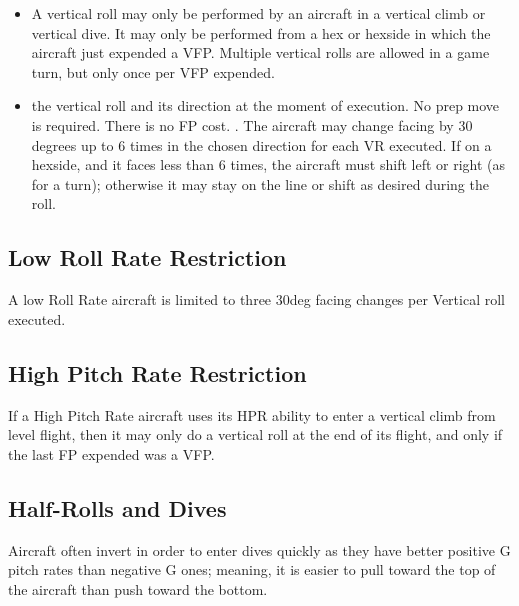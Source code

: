 \begin{itemize}

    \item{} A vertical roll may only be performed by an aircraft in a vertical climb or vertical dive. It may only be performed from a hex or hexside in which the aircraft just expended a VFP. Multiple vertical rolls are allowed in a game turn, but only once per VFP expended.

    \item{}  the vertical roll and its direction at the moment of execution. No prep move is required. There is no FP cost. . The aircraft may change facing  by 30 degrees up to 6 times in the chosen direction for each VR executed. If on a hexside, and it faces less than 6 times, the aircraft must shift left or right (as for a turn); otherwise it may stay on the line or shift as desired during the roll.  

\end{itemize}

\subsection{Low Roll Rate Restriction} A low Roll Rate aircraft is limited to three 30{deg} facing changes per Vertical roll executed.

\subsection{High Pitch Rate Restriction} If a High Pitch Rate aircraft uses its HPR ability to enter a vertical climb from level flight, then it may only do a vertical roll at the end of its flight, and only if the last FP expended was a VFP.

\subsection{Half-Rolls and Dives}
\label{rule:half-rolls-and-dives}

Aircraft often invert in order to enter dives quickly as they have better positive G pitch rates than negative G ones; meaning, it is easier to pull toward the top of the aircraft than push toward the bottom.

